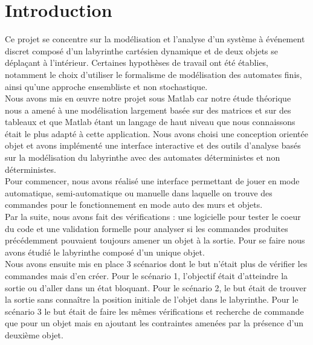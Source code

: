 \chapter*{Introduction}


Ce projet se concentre sur la modélisation et l'analyse d'un système à événement discret composé d'un labyrinthe cartésien dynamique et de deux objets se déplaçant à l'intérieur. Certaines hypothèses de travail ont été établies, notamment le choix d'utiliser le formalisme de modélisation des automates finis, ainsi qu'une approche ensembliste et non stochastique.\\
Nous avons mis en \oe uvre notre projet sous Matlab car notre étude théorique nous a amené à une modélisation largement basée sur des matrices et sur des tableaux et que Matlab étant un langage de haut niveau que nous connaissons était le plus adapté à cette application. Nous avons choisi une conception orientée objet et avons implémenté une interface interactive et des outils d'analyse basés sur la modélisation du labyrinthe avec des automates déterministes et non déterministes.\\
Pour commencer, nous avons réalisé une interface permettant de jouer en mode automatique, semi-automatique ou manuelle dans laquelle on trouve des commandes pour le fonctionnement en mode auto des murs et objets.\\
Par la suite, nous avons fait des vérifications : une logicielle pour tester le coeur du code et une validation formelle pour analyser si les commandes produites précédemment pouvaient toujours amener un objet à la sortie. Pour se faire nous avons étudié le labyrinthe composé d'un unique objet.\\
Nous avons ensuite mis en place 3 scénarios dont le but n'était plus de vérifier les commandes mais d'en créer. Pour le scénario 1, l'objectif était d'atteindre la sortie ou d'aller dans un état bloquant. Pour le scénario 2, le but était de trouver la sortie sans connaître la position initiale de l'objet dans le labyrinthe. Pour le scénario 3 le but était de faire les mêmes vérifications et recherche de commande que pour un objet mais en ajoutant les contraintes amenées par la présence d'un deuxième objet.


